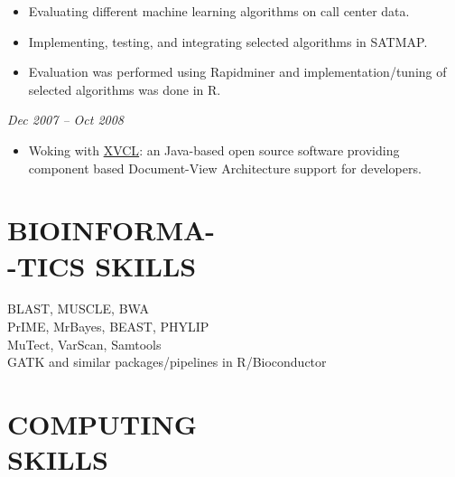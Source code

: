 \documentclass[margin, 10pt]{res} %
\begin{document}
\begin{resume}
\begin{itemize} \itemsep -2pt %
\item Evaluating different machine learning algorithms on call center data. 
\item Implementing, testing, and integrating selected algorithms in SATMAP. 
\item Evaluation was performed using Rapidminer and implementation/tuning of selected algorithms was done in R.
\end{itemize}
 
{\sl \textbf{}} \hfill \textit{Dec 2007 -- Oct 2008} \\
{\color{RubineRed}{Computer Science Department, LUMS, Pakistan}} 
\begin{itemize} 
\item Woking with \href{http://www.sciencedirect.com/science/article/pii/S0167642304000978}{XVCL}: an Java-based open source software providing component based Document-View Architecture support for developers. 
\end{itemize} 



\section{BIOINFORMA- \\ -TICS SKILLS} 

{\bf \color{Brown}{Sequence alignment tools:}} 
 BLAST, MUSCLE, BWA \\
{\bf \color{Brown}{Phylogenetics tools:}} 
 PrIME, MrBayes, BEAST, PHYLIP \\
{\bf \color{Brown}{Variant calling tools:}} 
  MuTect, VarScan, Samtools \\
{\bf \color{Brown}{Cancer analysis tools/pipelines:}} 
  GATK and similar packages/pipelines in R/Bioconductor\\

\section{COMPUTING \\ SKILLS} 


\end{resume}
\end{document}
